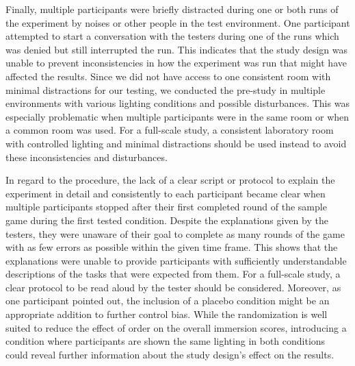 \documentclass[12pt,twoside,english]{article}
\begin{document}
Finally, multiple participants were briefly distracted during one or both runs of the experiment by noises or other people in the test environment.
One participant attempted to start a conversation with the testers during one of the runs which was denied but still interrupted the run.
This indicates that the study design was unable to prevent inconsistencies in how the experiment was run that might have affected the results.
Since we did not have access to one consistent room with minimal distractions for our testing, we conducted the pre-study in multiple environments with various lighting conditions and possible disturbances.
This was especially problematic when multiple participants were in the same room or when a common room was used.
For a full-scale study, a consistent laboratory room with controlled lighting and minimal distractions should be used instead to avoid these inconsistencies and disturbances.

In regard to the procedure, the lack of a clear script or protocol to explain the experiment in detail and consistently to each participant became clear when multiple participants stopped after their first completed round of the sample game during the first tested condition.
Despite the explanations given by the testers, they were unaware of their goal to complete as many rounds of the game with as few errors as possible within the given time frame.
This shows that the explanations were unable to provide participants with sufficiently understandable descriptions of the tasks that were expected from them.
For a full-scale study, a clear protocol to be read aloud by the tester should be considered.
Moreover, as one participant pointed out, the inclusion of a placebo condition might be an appropriate addition to further control bias.
While the randomization is well suited to reduce the effect of order on the overall immersion scores, introducing a condition where participants are shown the same lighting in both conditions could reveal further information about the study design's effect on the results.
\end{document}
